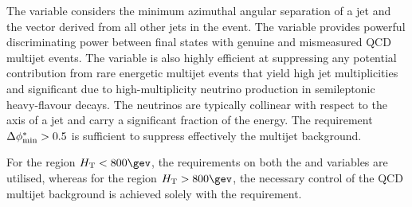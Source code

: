 The \dphi variable considers the minimum azimuthal angular separation
of a jet and the \mht vector derived from all other jets in the
event. The \dphi variable provides powerful discriminating power
between final states with genuine \ptvecmiss and mismeasured QCD multijet
events. The variable is also highly efficient at suppressing any
potential contribution from rare energetic multijet events that yield
high jet multiplicities and significant \ETmiss due to
high-multiplicity neutrino production in semileptonic heavy-flavour
decays. The neutrinos are typically collinear with respect to the axis
of a jet and carry a significant fraction of the energy. The
requirement $\Delta\phi^{*}_{\rm min} > 0.5$ is sufficient to suppress effectively the
multijet background.

For the region $\scalht < 800\gev$, the requirements on both the
\alphat and \dphi variables are utilised, whereas for the region
$\scalht > 800\gev$, the necessary control of the QCD multijet
background is achieved solely with the \dphi requirement. 



